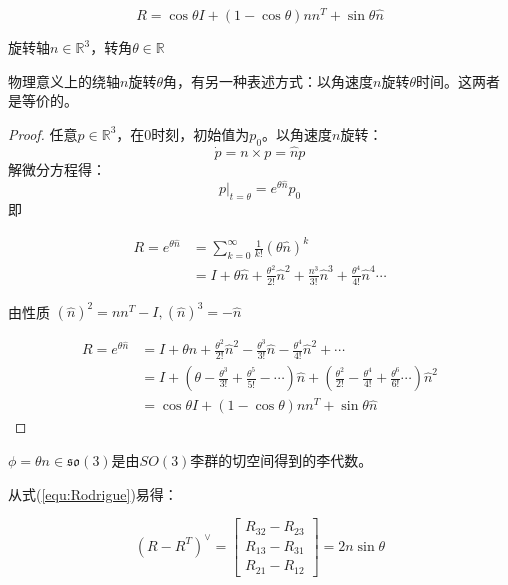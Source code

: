   \begin{equation}
    R=\cos \theta I+(1- \cos \theta)nn^T+\sin\theta \widehat n
    \label{equ:Rodrigue}
  \end{equation}

  旋转轴$n \in \mathbb{R}^{3}$，转角$\theta \in \mathbb{R}$

  物理意义上的绕轴$n$旋转$\theta$角，有另一种表述方式：以角速度$n$旋转$\theta$时间。这两者是等价的。
  \begin{proof}

    任意$p \in \mathbb{R}^{3}$，在0时刻，初始值为$p_0$。以角速度$n$旋转：
    $$\dot p=n \times p=\widehat n p$$
    解微分方程得：
    $$p|_{t=\theta}=e^{\theta \widehat n} p_0$$
    即

    $$\begin{aligned}R=e^{\theta \widehat n}&=\sum_{k=0}^\infty \frac{1}{k!}(\theta \widehat n)^k\\
      & =I+\theta \widehat n+\frac{\theta^2}{2 !} \widehat{n}^2+\frac{n^3}{3 !} \widehat{n}^3+\frac{\theta^4}{4 !} \widehat{n}^4\cdots \end{aligned}      $$

    由性质 $(\widehat n)^2=nn^T-I,(\widehat n)^3=-\widehat n$

      $$\begin{aligned}R=e^{\theta \widehat n}&=
      I+\theta \widehat{n}+\frac{\theta^2}{2 !} \widehat{n}^2-\frac{\theta^3}{3 !} \widehat{n}-\frac{\theta^4}{4 !} \widehat{n}^2+\cdots \\
      & =I+\left(\theta-\frac{\theta^3}{3 !}+\frac{\theta^5}{5 !}-\cdots\right) \widehat{n}+\left(\frac{\theta^2}{2 !}-\frac{\theta^4}{4 !}+\frac{\theta^6}{6 !} \cdots\right) \widehat{n}^2 \\
      &=\cos \theta I+(1- \cos \theta)nn^T+\sin\theta \widehat n
      \end{aligned}      $$

  \end{proof}

  $\phi=\theta n \in \mathfrak{so}(3)$是由$SO(3)$李群的切空间得到的李代数\cite{Liegroup}。

  从式(\ref{equ:Rodrigue})易得：

\begin{equation}
  (R-R^T)^\vee=\begin{bmatrix}
    R_{32}-R_{23} \\
    R_{13}-R_{31} \\
    R_{21}-R_{12}
    \end{bmatrix}=2 n \sin\theta
    \label{error}
\end{equation}

